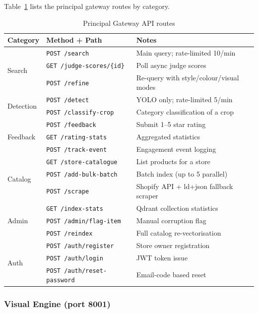 \documentclass[12pt]{article}
\begin{document}
Table~\ref{tab:gw-routes} lists the principal gateway routes by category.

\begin{table}[H]
\centering
\small
\begin{tabular}{@{}lll@{}}
\toprule
\textbf{Category} & \textbf{Method + Path} & \textbf{Notes} \\ \midrule
\multirow{3}{*}{Search} & \texttt{POST /search} & Main query; rate-limited 10/min \\
 & \texttt{GET  /judge-scores/\{id\}} & Poll async judge scores \\
 & \texttt{POST /refine} & Re-query with style/colour/visual modes \\ \midrule
\multirow{2}{*}{Detection} & \texttt{POST /detect} & YOLO only; rate-limited 5/min \\
 & \texttt{POST /classify-crop} & Category classification of a crop \\ \midrule
\multirow{3}{*}{Feedback} & \texttt{POST /feedback} & Submit 1--5 star rating \\
 & \texttt{GET  /rating-stats} & Aggregated statistics \\
 & \texttt{POST /track-event} & Engagement event logging \\ \midrule
\multirow{3}{*}{Catalog} & \texttt{GET  /store-catalogue} & List products for a store \\
 & \texttt{POST /add-bulk-batch} & Batch index (up to 5 parallel) \\
 & \texttt{POST /scrape} & Shopify API + ld+json fallback scraper \\ \midrule
\multirow{3}{*}{Admin} & \texttt{GET  /index-stats} & Qdrant collection statistics \\
 & \texttt{POST /admin/flag-item} & Manual corruption flag \\
 & \texttt{POST /reindex} & Full catalog re-vectorisation \\ \midrule
\multirow{3}{*}{Auth} & \texttt{POST /auth/register} & Store owner registration \\
 & \texttt{POST /auth/login} & JWT token issue \\
 & \texttt{POST /auth/reset-password} & Email-code based reset \\ \bottomrule
\end{tabular}
\caption{Principal Gateway API routes}
\label{tab:gw-routes}
\end{table}

\subsubsection{Visual Engine (port 8001)}
\end{document}
